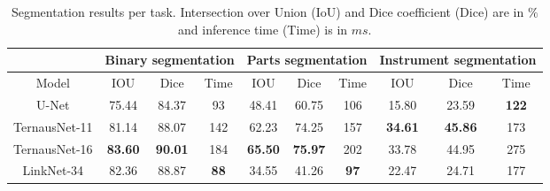 \documentclass[runningheads,a4paper]{llncs}[2015/06/24]
\begin{document}
\begin{table}[t!]
\caption{Segmentation results per task. Intersection over Union (IoU) and Dice coefficient (Dice) are in $\%$ and inference time (Time) is in $ms$.}
\label{table:segmentation}
\centering   
\begin{tabular}{|c | c | c | c | c | c | c | c | c | c|}
\hline\noalign{\smallskip}
&
\multicolumn{3}{c}{Binary segmentation} &
\multicolumn{3}{|c|}{Parts segmentation} &
\multicolumn{3}{c|}{Instrument segmentation} \\
\hline
Model & IOU & Dice & Time & IOU & Dice & Time & IOU & Dice & Time \\
\hline
U-Net & 75.44 & 84.37 & 93 & 48.41 & 60.75 & 106 & 15.80 & 23.59 & \textbf{122}\\
TernausNet-11 & 81.14 & 88.07 & 142 & 62.23 & 74.25 & 157 & \textbf{34.61} & \textbf{45.86} & 173\\
TernausNet-16 & \textbf{83.60} & \textbf{90.01} & 184 & \textbf{65.50} & \textbf{75.97} & 202 & 33.78 & 44.95 & 275\\
LinkNet-34 & 82.36 & 88.87 & \textbf{88} & 34.55 & 41.26 & \textbf{97} & 22.47 & 24.71 & 177\\

\hline
\end{tabular}
\end{table}
\end{document}
